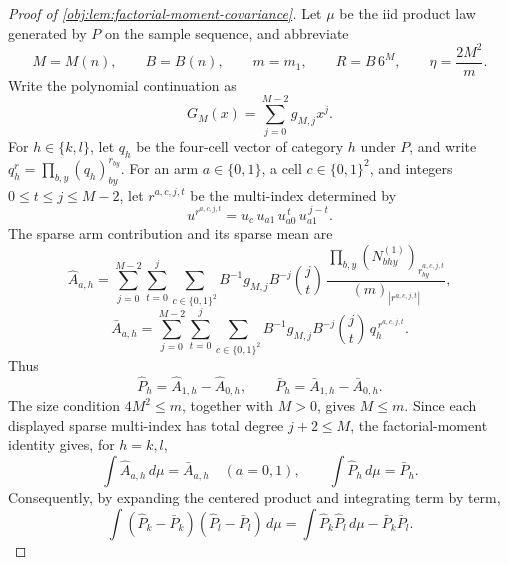 \begin{proof}[Proof of \cref{obj:lem:factorial-moment-covariance}]
Let \(\mu\) be the iid product law generated by \(P\) on the sample sequence, and abbreviate
\[
M=M(n),\qquad B=B(n),\qquad m=m_1,\qquad
R=B\,6^M,\qquad \eta=\frac{2M^2}{m}.
\]
Write the polynomial continuation as
\[
G_M(x)=\sum_{j=0}^{M-2}g_{M,j}x^j.
\]
For \(h\in\{k,l\}\), let \(q_h\) be the four-cell vector of category \(h\) under
\(P\), and write \(q_h^r=\prod_{b,y}(q_h)_{by}^{r_{by}}\).  For an arm
\(a\in\{0,1\}\), a cell \(c\in\{0,1\}^2\), and integers
\(0\le t\le j\le M-2\), let \(r^{a,c,j,t}\) be the multi-index determined by
\[
u^{r^{a,c,j,t}}
=u_c\,u_{a1}\,u_{a0}^{\,t}\,u_{a1}^{\,j-t}.
\]
The sparse arm contribution and its sparse mean are
\[
\widehat A_{a,h}
=
\sum_{j=0}^{M-2}\sum_{t=0}^{j}\sum_{c\in\{0,1\}^2}
B^{-1}g_{M,j}B^{-j}\binom jt\,
\frac{\prod_{b,y}(N^{(1)}_{bhy})_{r^{a,c,j,t}_{by}}}{(m)_{|r^{a,c,j,t}|}},
\]
\[
\bar A_{a,h}
=
\sum_{j=0}^{M-2}\sum_{t=0}^{j}\sum_{c\in\{0,1\}^2}
B^{-1}g_{M,j}B^{-j}\binom jt\,q_h^{\,r^{a,c,j,t}}.
\]
Thus
\[
\widehat P_h=\widehat A_{1,h}-\widehat A_{0,h},
\qquad
\bar P_h=\bar A_{1,h}-\bar A_{0,h}.
\]
The size condition \(4M^2\le m\), together with \(M>0\), gives \(M\le m\).  Since
each displayed sparse multi-index has total degree \(j+2\le M\), the factorial-moment
identity gives, for \(h=k,l\),
\[
\int \widehat A_{a,h}\,d\mu=\bar A_{a,h}\quad(a=0,1),
\qquad
\int \widehat P_h\,d\mu=\bar P_h .
\]
Consequently, by expanding the centered product and integrating term by term,
\[
\int(\widehat P_k-\bar P_k)(\widehat P_l-\bar P_l)\,d\mu
=
\int \widehat P_k\widehat P_l\,d\mu-\bar P_k\bar P_l .
\]


\end{proof}
